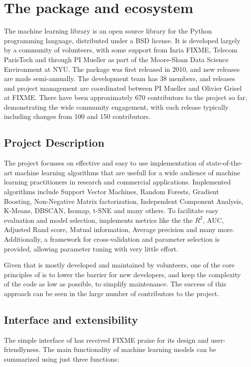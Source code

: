 \section{The \sklearn{} package and ecosystem}
The \sklearn{} machine learning library is an open source library for the
Python programming language, distributed under a BSD license.
It is developed largely by a community of volunteers, with some support from
Inria FIXME, Telecom ParisTech and through PI Mueller as part of the
Moore-Sloan Data Science Environment at NYU\@.
The package was first released in 2010, and new releases are made semi-annually.
The development team has 38 members, and releases and project management are
coordinated between PI Mueller and Olivier Grisel at FIXME\@.
There have been approximately 670 contributors to the project so far, demonstrating
the wide community engagement, with each release typically including changes
from 100 and 150 contributors.

\subsection{Project Description}
The \sklearn{} project focusses on effective and easy to use implementation
of state-of-the-art machine learning algorithms that are usefull for a wide
audience of machine learning practitioners in research and commercial applications.
Implemented algorithms include Support Vector Machines, Random Forests, Gradient Boosting,
Non-Negative Matrix factorization, Independent Component Analysis, K-Means, DBSCAN, Isomap,
t-SNE and many others. To facilitate easy evaluation and model selection, \sklearn{}
implements metrics like the the $R^2$, AUC, Adjusted Rand score, Mutual information, Average precision
and many more. Additionally, a framework for cross-validation and parameter selection is
provided, allowing parameter tuning with very little effort.

Given that \sklearn{} is mostly developed and maintained by volunteers,
one of the core principles of \sklearn{} is to lower the barrier for new developers,
and keep the complexity of the code as low as possible, to simplify maintenance.
The success of this approach can be seen in the large number of contributors to
the project.

\subsection{Interface and extensibility}
The simple interface of \sklearn{} has received FIXME praise for its design and user-friendlyness.
The main functionality of machine learning models can be summarized using just three functions:

